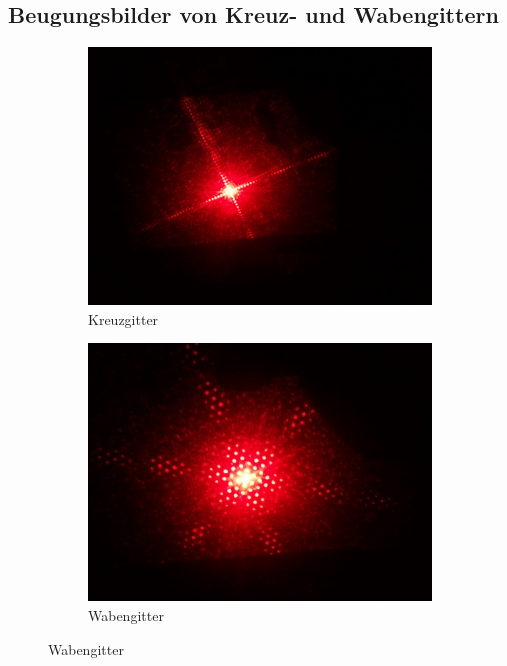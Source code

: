 \documentclass[ngerman, parskip*]{scrartcl}
\begin{document}
\subsection{Beugungsbilder von Kreuz- und Wabengittern}

\begin{figure}
\centering
        \begin{subfigure}[!h]{0.49\textwidth}
          \centering
          \includegraphics[width=\textwidth,natwidth=2560,natheight=1920]{Bilder/Kreuzgitter.jpg}
          \caption{Kreuzgitter}
        \end{subfigure}
        \begin{subfigure}[!h]{0.49\textwidth}
          \centering
          \includegraphics[width=\textwidth,natwidth=2560,natheight=1920]{Bilder/Wabengitter.jpg}
          \caption{Wabengitter}
        \end{subfigure}
\end{figure}
\end{document}
